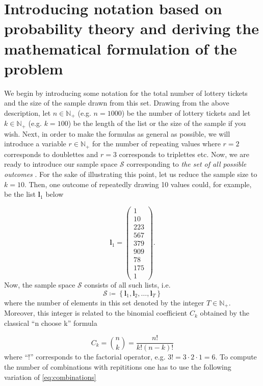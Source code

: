 \documentclass{article}
\begin{document}
\section{Introducing notation based on probability theory and deriving the mathematical formulation of the problem}
We begin by introducing some notation for the total number of lottery tickets and
the size of the sample drawn from this set. Drawing from the above description, let
$n\in\mathbb{N}_+$ (e.g. $n=1000$) be the number of lottery tickets and let $k\in\mathbb{N}_+$ (e.g. $k=100$) be
the length of the list or the size of the sample if you wish. Next, in order to make
the formulas as general as possible, we will introduce a variable $r\in\mathbb{N}_+$ for the number of
repeating values where $r=2$ corresponds to doublettes and $r=3$ corresponds to triplettes etc. Now, we are ready to introduce our sample space $\mathcal{S}$ corresponding to \textit{the set of all possible outcomes} \cite{devore2008probability,rice2006mathematical}. For the sake of illustrating this point, let us reduce the sample size to $k=10$. Then, one outcome of repeatedly drawing 10 values could, for example, be the list $\mathbf{l}_1$ below

\begin{equation}
\mathbf{l}_1=\begin{pmatrix}1\\10\\223\\567\\379\\909\\78\\175\\1\end{pmatrix}.
\label{eq:list}
\end{equation}
Now, the sample space $\mathcal{S}$ consists of all such lists, i.e.
\begin{equation}
\mathcal{S}\coloneqq\left\{\mathbf{l}_1,\mathbf{l}_2,\ldots,\mathbf{l}_T\right\}
\label{eq:sampleSpace}
\end{equation}
where the number of elements in this set denoted by the integer $T\in\mathbb{N}_+$. Moreover, this integer is related to the binomial coefficient $C_k$ obtained by the classical ``n choose k'' formula \cite{devore2008probability,rice2006mathematical}

\begin{equation}
C_k={n\choose k} =\dfrac{n!}{k!(n-k)!}
  \label{eq:combinations}
\end{equation}
where ``!'' corresponds to the factorial operator, e.g. $3!=3\cdot 2\cdot 1=6$. To compute the number of combinations with repititions one has to use the following variation of \eqref{eq:combinations}
\end{document}

